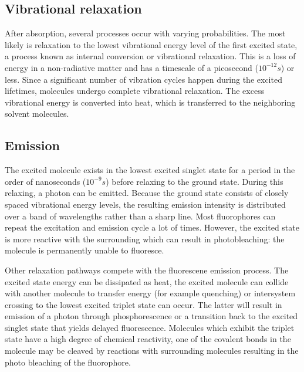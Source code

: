 \documentclass[twoside,single]{lion-msc}
\begin{document}
\subsection{Vibrational relaxation}
After absorption, several processes occur with varying probabilities. The most likely is relaxation to the lowest vibrational energy level of the first excited state, a process known as internal conversion or vibrational relaxation. This is a loss of energy in a non-radiative matter and has a timescale of a picosecond ($10^{-12}s$) or less. Since a significant number of vibration cycles happen during the excited lifetimes, molecules undergo complete vibrational relaxation. The excess vibrational energy is converted into heat, which is transferred to the neighboring solvent molecules.

\subsection{Emission}
The excited molecule exists in the lowest excited singlet state for a period in the order of nanoseconds ($10^{-9}s$) before relaxing to the ground state. During this relaxing, a photon can be emitted. Because the ground state consists of closely spaced vibrational energy levels, the resulting emission intensity is distributed over a band of wavelengths rather than a sharp line. Most fluorophores can repeat the excitation and emission cycle a lot of times. However, the excited state is more reactive with the surrounding which can result in photobleaching: the molecule is permanently unable to fluoresce. 

Other relaxation pathways compete with the fluorescene emission process. The excited state energy can be dissipated as heat, the excited molecule can collide with another molecule to transfer energy (for example quenching) or intersystem crossing to the lowest excited triplet state can occur. The latter will result in emission of a photon through phosphorescence or a transition back to the excited singlet state that yields delayed fluorescence. Molecules which exhibit the triplet state have a high degree of chemical reactivity, one of the covalent bonds in the molecule may be cleaved by reactions with surrounding molecules resulting in the photo bleaching of the fluorophore.
\end{document}
